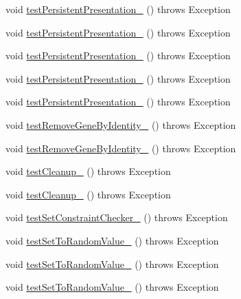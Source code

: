 \begin{DoxyCompactItemize}
void \hyperlink{classorg_1_1jgap_1_1impl_1_1_composite_gene_test_a77e9b2f30e74147b25cde6fe901b411a}{test\-Persistent\-Presentation\-\_} ()  throws Exception 
\item 
void \hyperlink{classorg_1_1jgap_1_1impl_1_1_composite_gene_test_a801ae596a2fbb71234f45d74aaff5fa7}{test\-Persistent\-Presentation\-\_} ()  throws Exception 
\item 
void \hyperlink{classorg_1_1jgap_1_1impl_1_1_composite_gene_test_a8505f1ffb4eae12e39d9b0f141e690f2}{test\-Persistent\-Presentation\-\_} ()  throws Exception 
\item 
void \hyperlink{classorg_1_1jgap_1_1impl_1_1_composite_gene_test_ac319beb9bd62a216ef67eaeab1ac7e38}{test\-Persistent\-Presentation\-\_} ()  throws Exception 
\item 
void \hyperlink{classorg_1_1jgap_1_1impl_1_1_composite_gene_test_a7534668b1dbc318d30106ab70f101d1b}{test\-Persistent\-Presentation\-\_} ()  throws Exception 
\item 
void \hyperlink{classorg_1_1jgap_1_1impl_1_1_composite_gene_test_a8b81965f142cc00a43daf344accc0c20}{test\-Remove\-Gene\-By\-Identity\-\_} ()  throws Exception 
\item 
void \hyperlink{classorg_1_1jgap_1_1impl_1_1_composite_gene_test_afaaf2f9dc85977784184fff4e3ae22e4}{test\-Remove\-Gene\-By\-Identity\-\_} ()  throws Exception 
\item 
void \hyperlink{classorg_1_1jgap_1_1impl_1_1_composite_gene_test_a6d87947e73b56641a1bd2b2eba3f9f6b}{test\-Cleanup\-\_} ()  throws Exception 
\item 
void \hyperlink{classorg_1_1jgap_1_1impl_1_1_composite_gene_test_acb5416fec687f783255a0d027dafb326}{test\-Cleanup\-\_} ()  throws Exception 
\item 
void \hyperlink{classorg_1_1jgap_1_1impl_1_1_composite_gene_test_a6614addee4f794acae2d385a6e0910ae}{test\-Set\-Constraint\-Checker\-\_} ()  throws Exception 
\item 
void \hyperlink{classorg_1_1jgap_1_1impl_1_1_composite_gene_test_a4f8cd39c323dddd486f448cb15f5875b}{test\-Set\-To\-Random\-Value\-\_} ()  throws Exception 
\item 
void \hyperlink{classorg_1_1jgap_1_1impl_1_1_composite_gene_test_a7e0f423c7773d1df23c8ecd61d7793a6}{test\-Set\-To\-Random\-Value\-\_} ()  throws Exception 
\item 
void \hyperlink{classorg_1_1jgap_1_1impl_1_1_composite_gene_test_a34f299e5071f10f1f2528ff5b3818ab1}{test\-Set\-To\-Random\-Value\-\_} ()  throws Exception 

\end{DoxyCompactItemize}
